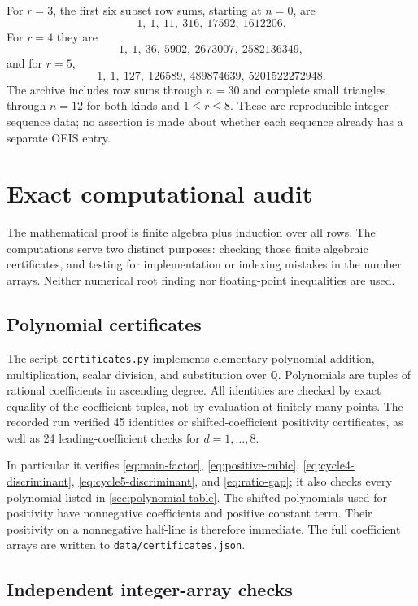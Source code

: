 \documentclass[11pt,a4paper]{article}
\numberwithin{equation}{section}
\theoremstyle{definition}
\theoremstyle{remark}
\newcommand{\Q}{\mathbb Q}
\begin{document}
For $r=3$, the first six subset row sums, starting at $n=0$, are
\[
 1,\ 1,\ 11,\ 316,\ 17592,\ 1612206.
\]
For $r=4$ they are
\[
 1,\ 1,\ 36,\ 5902,\ 2673007,\ 2582136349,
\]
and for $r=5$,
\[
 1,\ 1,\ 127,\ 126589,\ 489874639,\ 5201522272948.
\]
The archive includes row sums through $n=30$ and complete small triangles
through $n=12$ for both kinds and $1\le r\le8$. These are reproducible
integer-sequence data; no assertion is made about whether each sequence
already has a separate OEIS entry.

\section{Exact computational audit}\label{sec:verification}

The mathematical proof is finite algebra plus induction over all rows.
The computations serve two distinct purposes: checking those finite
algebraic certificates, and testing for implementation or indexing mistakes
in the number arrays. Neither numerical root finding nor floating-point
inequalities are used.

\subsection{Polynomial certificates}

The script \texttt{certificates.py} implements elementary polynomial
addition, multiplication, scalar division, and substitution over $\Q$.
Polynomials are tuples of rational coefficients in ascending degree.
All identities are checked by exact equality of the coefficient tuples,
not by evaluation at finitely many points. The recorded run verified
45 identities or shifted-coefficient positivity certificates, as well as
24 leading-coefficient checks for $d=1,\ldots,8$.

In particular it verifies \eqref{eq:main-factor},
\eqref{eq:positive-cubic}, \eqref{eq:cycle4-discriminant},
\eqref{eq:cycle5-discriminant}, and \eqref{eq:ratio-gap}; it also checks
every polynomial listed in \cref{sec:polynomial-table}. The shifted
polynomials used for positivity have nonnegative coefficients and positive
constant term. Their positivity on a nonnegative half-line is therefore
immediate. The full coefficient arrays are written to
\texttt{data/certificates.json}.

\subsection{Independent integer-array checks}
\end{document}
